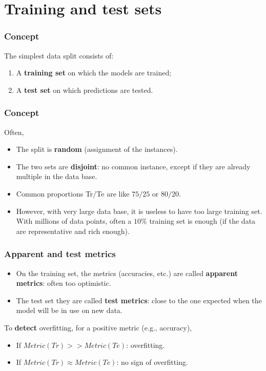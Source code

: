 \section{Training and test sets}
\begin{frame}
\frametitle{Concept}
The simplest data split consists of:
\begin{enumerate}
\item A {\bf training set} on which the models are trained;
\item A {\bf test set} on which predictions are tested.
\end{enumerate}
\end{frame}
\begin{frame}
\frametitle{Concept}
Often,
\begin{itemize}
\item The split is {\bf random} (assignment of the instances).
\item The two sets are {\bf disjoint}: no common instance, except if they are already multiple in the data base. 
\item Common proportions Tr/Te are like $75/25$ or $80/20$. 
\item However, with very large data base, it is useless to have too large training set. With millions of data points, often a $10\%$ training set is enough (if the data are representative and rich enough).
\end{itemize}
\end{frame}
\begin{frame}
\frametitle{Apparent and test metrics}
\begin{itemize}
\item On the training set, the metrics (accuracies, etc.) are called {\bf apparent metrics}: often too optimistic. 
\item The test set they are called {\bf test metrics}: close to the one expected when the model will be in use on new data.
\end{itemize}
To {\bf detect} overfitting, for a positive metric (e.g., accuracy),
\begin{itemize}
\item If $Metric(Tr) >> Metric(Te)$: overfitting.
\item If $Metric(Tr) \approx Metric(Te)$: no sign of overfitting.
\end{itemize}
\end{frame}
